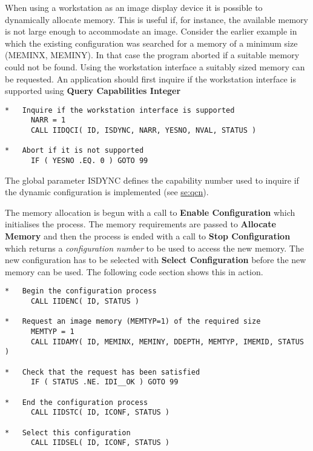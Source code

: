 When using a workstation as an image display device it is possible to
dynamically allocate memory. This is useful if, for instance, the
available memory is not large enough to accommodate an image. Consider
the earlier example in which the existing configuration was searched
for a memory of a minimum size (MEMINX, MEMINY). In that case the
program aborted if a suitable memory could not be found. Using the
workstation interface a suitably sized memory can be requested. An
application should first inquire if the workstation interface is
supported using {\bf Query Capabilities Integer}
\begin{small}
\begin{verbatim}
*   Inquire if the workstation interface is supported
      NARR = 1
      CALL IIDQCI( ID, ISDYNC, NARR, YESNO, NVAL, STATUS )

*   Abort if it is not supported
      IF ( YESNO .EQ. 0 ) GOTO 99
\end{verbatim}
\end{small}
The global parameter ISDYNC defines the capability number used to inquire
if the dynamic configuration is implemented (see
\hyperref{this appendix}{appendix~}{}{se:qcn}).

The memory allocation is begun with a call to {\bf Enable Configuration}
which initialises the process. The memory requirements are passed to
{\bf Allocate Memory} and then the process is ended with a call to
{\bf Stop Configuration} which returns a {\it configuration number} to
be used to access the new memory. The new configuration has to be
selected with {\bf Select Configuration} before the new memory can
be used. The following code section shows this in action.
\begin{small}
\begin{verbatim}
*   Begin the configuration process
      CALL IIDENC( ID, STATUS )

*   Request an image memory (MEMTYP=1) of the required size
      MEMTYP = 1
      CALL IIDAMY( ID, MEMINX, MEMINY, DDEPTH, MEMTYP, IMEMID, STATUS )

*   Check that the request has been satisfied
      IF ( STATUS .NE. IDI__OK ) GOTO 99

*   End the configuration process
      CALL IIDSTC( ID, ICONF, STATUS )

*   Select this configuration
      CALL IIDSEL( ID, ICONF, STATUS )
\end{verbatim}
\end{small}

\newpage
